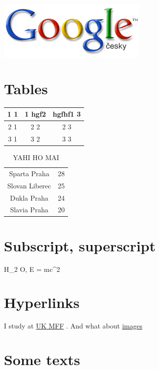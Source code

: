 \documentclass{article}
\begin{document}
\par
\includegraphics{logo.png}


\section{Tables}
\begin{table}[h!]
\centering
\begin{tabular}{|c|c|c|}
\hline
1 1 & 1 hgf2 & hgfhf1 3 \\
\hline
2 1 & 2 2 & 2 3 \\
\hline
3 1 & 3 2 & 3 3 \\
\hline

\end{tabular}
\end{table}
\newline\begin{table}[h!]
\centering
\caption{ YAHI HO MAI}
\begin{tabular}{c c }
Sparta Praha & 28 \\
Slovan Liberec & 25 \\
Dukla Praha & 24 \\
Slavia Praha & 20 \\

\end{tabular}
\end{table}
\section{Subscript, superscript}

\par
H_{2}
O, E = mc^{2}

\section{Hyperlinks}

\par
I study at 
\href{http://www.mff.cuni.cz}{UK MFF}
. And
    what about 
\href{#img}{images}

\section{Some texts}
\end{document}
